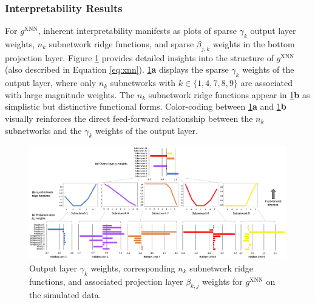 \documentclass[information,article,submit,moreauthors,pdftex]{definitions/mdpi}
\begin{document}
\subsubsection{Interpretability Results}\label{ssec:xnn_sim}

For $g^\text{XNN}$, inherent interpretability manifests as plots of sparse $\gamma_k$ output layer weights, $n_k$ subnetwork ridge functions, and sparse $\beta_{j,k}$ weights in the bottom projection layer. Figure \ref{fig:sim_xnn_glob_ridge} provides detailed insights into the structure of $g^\text{XNN}$ (also described in Equation \ref{eq:xnn}). \ref{fig:sim_xnn_glob_ridge}\textbf{a} displays the sparse $\gamma_k$ weights of the output layer, where only $n_k$ subnetworks with $k \in \{1, 4, 7, 8, 9\}$ are associated with large magnitude weights. The $n_k$ subnetwork ridge functions appear in \ref{fig:sim_xnn_glob_ridge}\textbf{b} as simplistic but distinctive functional forms. Color-coding between \ref{fig:sim_xnn_glob_ridge}\textbf{a} and \ref{fig:sim_xnn_glob_ridge}\textbf{b} visually reinforces the direct feed-forward relationship between the $n_k$ subnetworks and the $\gamma_k$ weights of the output layer.

\begin{figure}[H]
	\hskip-35pt\includegraphics[width=19cm]{img/sim_xnn_glob_ridge.png}
	\caption{Output layer $\gamma_k$ weights, corresponding $n_k$ subnetwork ridge functions, and associated projection layer $\beta_{k,j}$ weights for $g^\text{XNN}$ on the simulated data.}
	\label{fig:sim_xnn_glob_ridge}
\end{figure} 
\end{document}
